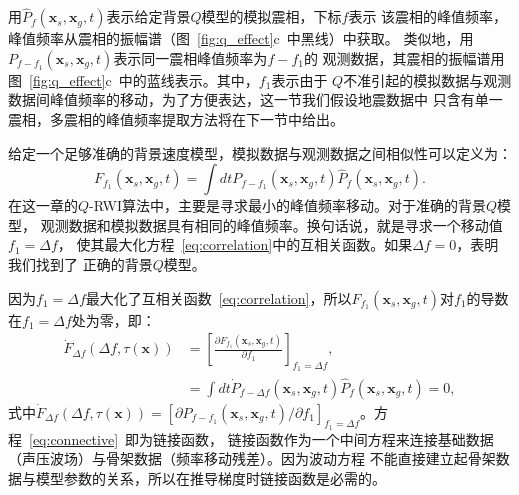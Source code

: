 用$\hat{P}_f(\mathbf{x}_s,\mathbf{x}_g,t)$表示给定背景$Q$模型的模拟震相，下标$f$表示
该震相的峰值频率，峰值频率从震相的振幅谱（图~\ref{fig:q_effect}c~中黑线）中获取。
类似地，用$P_{f-f_1}(\mathbf{x}_s,\mathbf{x}_g,t)$表示同一震相峰值频率为$f-f_1$的
观测数据，其震相的振幅谱用图~\ref{fig:q_effect}c~中的蓝线表示。其中，$f_1$表示由于
$Q$不准引起的模拟数据与观测数据间峰值频率的移动，为了方便表达，这一节我们假设地震数据中
只含有单一震相，多震相的峰值频率提取方法将在下一节中给出。

给定一个足够准确的背景速度模型，模拟数据与观测数据之间相似性可以定义为：
\begin{equation}
	F_{f_1}(\mathbf{x}_s,\mathbf{x}_g,t)=\int dt P_{f-f_1}(\mathbf{x}_s,\mathbf{x}_g,t) 
	\hat{P}_f(\mathbf{x}_s,\mathbf{x}_g,t).
	\label{eq:correlation}
\end{equation}
在这一章的$Q$-RWI算法中，主要是寻求最小的峰值频率移动。对于准确的背景$Q$模型，
观测数据和模拟数据具有相同的峰值频率。换句话说，就是寻求一个移动值$f_1=\Delta f$，
使其最大化方程~\ref{eq:correlation}中的互相关函数。如果$\Delta f=0$，表明我们找到了
正确的背景$Q$模型。

因为$f_1=\Delta f$最大化了互相关函数~\ref{eq:correlation}，所以$F_{f_1}(\mathbf{x}_s,
\mathbf{x}_g,t)$对$f_1$的导数在$f_1=\Delta f$处为零，即：
\begin{equation}
	\begin{aligned}
		\dot{F}_{\Delta f}(\Delta f,\tau(\mathbf{x})) &=\left[\frac{\partial F_{f_1}
	(\mathbf{x}_s,\mathbf{x}_g,t)}{\partial f_1}\right]_{f_1=\Delta f}, \\
		&= \int dt \dot{P}_{f-\Delta f}(\mathbf{x}_s,\mathbf{x}_g,t)
	\hat{P}_f(\mathbf{x}_s,\mathbf{x}_g,t)=0,
	\label{eq:connective}
	\end{aligned}
\end{equation}
式中$\dot{F}_{\Delta f}(\Delta f,\tau(\mathbf{x}))=[\partial P_{f-f_1}(\mathbf{x}_s,
\mathbf{x}_g,t)/\partial f_1]_{f_1=\Delta f}$。方程~\ref{eq:connective}~即为链接函数，
链接函数作为一个中间方程来连接基础数据（声压波场）与骨架数据（频率移动残差）。因为波动方程
不能直接建立起骨架数据与模型参数的关系，所以在推导梯度时链接函数是必需的。

